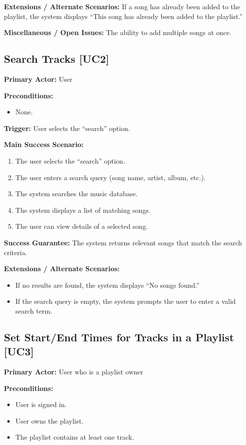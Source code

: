 \documentclass{article}
\begin{document}
\textbf{Extensions / Alternate Scenarios:}  
If a song has already been added to the playlist, the system displays ``This song has already been added to the playlist.''

\textbf{Miscellaneous / Open Issues:}  
The ability to add multiple songs at once.

\subsection{Search Tracks [UC2]}
\textbf{Primary Actor:} User

\textbf{Preconditions:}
\begin{itemize}
  \item None.
\end{itemize}

\textbf{Trigger:} User selects the ``search'' option.

\textbf{Main Success Scenario:}
\begin{enumerate}
  \item The user selects the ``search'' option.
  \item The user enters a search query (song name, artist, album, etc.).
  \item The system searches the music database.
  \item The system displays a list of matching songs.
  \item The user can view details of a selected song.
\end{enumerate}

\textbf{Success Guarantee:}  
The system returns relevant songs that match the search criteria.

\textbf{Extensions / Alternate Scenarios:}
\begin{itemize}
  \item If no results are found, the system displays ``No songs found.''
  \item If the search query is empty, the system prompts the user to enter a valid search term.
\end{itemize}

\subsection{Set Start/End Times for Tracks in a Playlist [UC3]}
\textbf{Primary Actor:} User who is a playlist owner

\textbf{Preconditions:}
\begin{itemize}
  \item User is signed in.
  \item User owns the playlist.
  \item The playlist contains at least one track.
\end{itemize}
\end{document}
